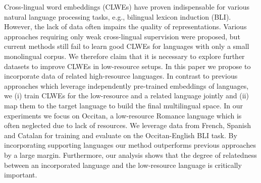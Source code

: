 Cross-lingual word embeddings (CLWEs) have proven indispensable for various natural language processing tasks, e.g., bilingual lexicon induction (BLI). However, the lack of data often impairs the quality of representations. Various approaches requiring only weak cross-lingual supervision were proposed, but current methods still fail to learn good CLWEs for languages with only a small monolingual corpus. We therefore claim that it is necessary to explore further datasets to improve CLWEs in low-resource setups. In this paper we propose to incorporate data of related high-resource languages. In contrast to previous approaches which leverage independently pre-trained embeddings of languages, we (i) train CLWEs for the low-resource and a related language jointly and (ii) map them to the target language to build the final multilingual space. In our experiments we focus on Occitan, a low-resource Romance language which is often neglected due to lack of resources. We leverage data from French, Spanish and Catalan for training and evaluate on the Occitan-English BLI task. By incorporating supporting languages our method outperforms previous approaches by a large margin. Furthermore, our analysis shows that the degree of relatedness between an incorporated language and the low-resource language is critically important.
